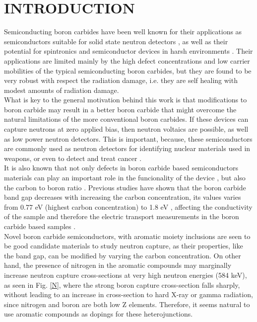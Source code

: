 \chapter{INTRODUCTION}
\label{ch:Intro}


\noindent Semiconducting boron carbides have been well known for their applications as semiconductors suitable for solid state neutron detectors \cite{Intro_1, Intro_2, Intro_3, Intro_4}, as well as their potential for spintronics and semiconductor devices in harsh environments \cite{Intro_5, Intro_6, Intro_7}. Their applications are limited mainly by the high defect concentrations and low carrier mobilities \cite{5, 6} of the typical semiconducting boron carbides, but they are found to be very robust with respect the radiation damage, i.e. they are self healing with modest amounts of radiation damage.\\


\noindent What is key to the general motivation behind this work is that modifications to boron carbide may result in a better boron carbide that might overcome the natural limitations of the more conventional boron carbides. If these devices can capture neutrons at zero applied bias, then neutron voltaics are possible, as well as low power neutron detectors. This is important, because, these semiconductors are commonly used as neutron detectors for identifying nuclear materials used in weapons, or even to detect and treat cancer \cite{cancer, cancer2}. \\

\noindent It is also known that not only defects in boron carbide based semiconductors materials can play an important role in the funcionality of the device \cite{Caretti, Cennignani, Pasquale_DBA, Pasquale_2}, but also the carbon to boron ratio  \cite{Sunwoo, Shirai, Park, Werheit}. Previous studies have shown that the boron carbide band gap decreases with increasing the carbon concentration, its values varies from 0.77 eV (highest carbon concentration) to 1.8 eV \cite{Sunwoo, Shirai}, affecting the conductivity of the sample and therefore the electric transport measurements in the boron carbide based samples \cite{Tallant}.\\


\noindent Novel boron carbide semiconductors, with aromatic moiety inclusions are seen \cite{Pasquale_Intro} to be good candidate materials to study neutron capture, as their properties, like the band gap, can be modified by varying the carbon concentration. On other hand, the presence of nitrogen in the aromatic compounds may marginally increase neutron capture cross-sections at very high neutron energies (584 keV), as seen in Fig. \ref{N}, where the strong boron capture cross-section falls sharply, without leading to an increase in cross-section to hard X-ray or gamma radiation, since nitrogen and boron are both low Z elements. Therefore, it seems natural to use aromatic compounds as dopings for these heterojunctions. \\

